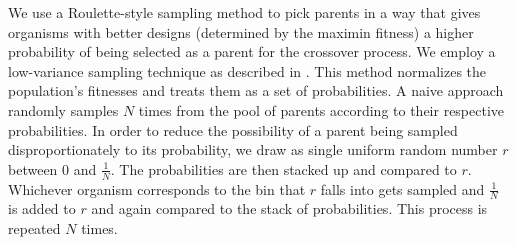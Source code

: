 \documentclass[letterpaper, 10 pt, conference]{ieeeconf}  %
\begin{document}
We use a Roulette-style sampling method to pick parents in a way that gives organisms with better designs (determined by the maximin fitness) a higher probability of being selected as a parent for the crossover process. We employ a low-variance sampling technique as described in \cite{Thrun2006}. This method normalizes the population's fitnesses and treats them as a set of probabilities. A naive approach randomly samples $N$ times from the pool of parents according to their respective probabilities. In order to reduce the possibility of a parent being sampled disproportionately to its probability, we draw as single uniform random number $r$ between 0 and $\tfrac{1}{N}$. The probabilities are then stacked up and compared to $r$. Whichever organism corresponds to the bin that $r$ falls into gets sampled and $\tfrac{1}{N}$ is added to $r$ and again compared to the stack of probabilities. This process is repeated $N$ times.



\end{document}
